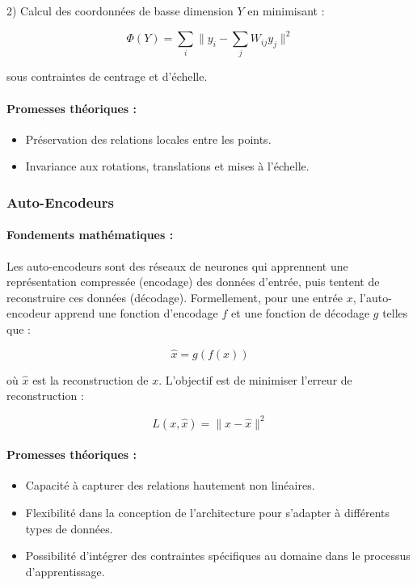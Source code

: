 \documentclass[unnumsec,webpdf,modern,large]{projet_manifold}%
\theoremstyle{thmstyleone}%
\theoremstyle{thmstyletwo}%
\theoremstyle{thmstylethree}%
\begin{document}
2) Calcul des coordonnées de basse dimension $Y$ en minimisant :

\begin{equation}
    \Phi(Y) = \sum_i \|y_i - \sum_j W_{ij}y_j\|^2
\end{equation}

sous contraintes de centrage et d'échelle.

\paragraph{Promesses théoriques :}
\begin{itemize}
    \item Préservation des relations locales entre les points.
    \item Invariance aux rotations, translations et mises à l'échelle.
   
\end{itemize}

\subsubsection{Auto-Encodeurs}

\paragraph{Fondements mathématiques :}
Les auto-encodeurs sont des réseaux de neurones qui apprennent une représentation compressée (encodage) des données d'entrée, puis tentent de reconstruire ces données (décodage). Formellement, pour une entrée $x$, l'auto-encodeur apprend une fonction d'encodage $f$ et une fonction de décodage $g$ telles que :

\begin{equation}
    \hat{x} = g(f(x))
\end{equation}

où $\hat{x}$ est la reconstruction de $x$. L'objectif est de minimiser l'erreur de reconstruction :

\begin{equation}
    L(x, \hat{x}) = \|x - \hat{x}\|^2
\end{equation}

\paragraph{Promesses théoriques :}
\begin{itemize}
    \item Capacité à capturer des relations hautement non linéaires.
    \item Flexibilité dans la conception de l'architecture pour s'adapter à différents types de données.
    \item Possibilité d'intégrer des contraintes spécifiques au domaine dans le processus d'apprentissage.
\end{itemize}
\end{document}
